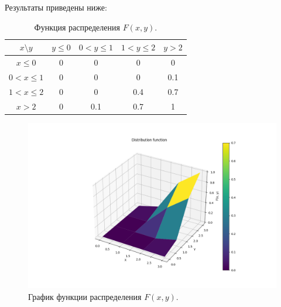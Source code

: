 \documentclass[a4paper, 12pt]{article}
\begin{document}
    Результаты приведены ниже:
    \begin{table}[h]
        \centering
        \begin{tabular}{|c|c|c|c|c|}
        \hline
        $x \text{\textbackslash} y$ & $y\leq0$ & $0<y\leq1$ & $1<y\leq2$ & $y>2$ \\
        \hline
        $x\leq0$ & 0 & 0 & 0 & 0\\
        \hline
        $0<x\leq1$ & 0 & 0 & 0 & 0.1\\
        \hline
        $1<x\leq2$ & 0 & 0 & 0.4 & 0.7\\
        \hline
        $x>2$ & 0 & 0.1 & 0.7 & 1\\
        \hline
        \end{tabular}
        \caption{Функция распределения $F(x,y)$.}
        \label{tab:F_x}
    \end{table}
    \begin{figure}[H]
        \centering
        \includegraphics[scale=0.5]{disf.png}
        \captionsetup{skip=0pt}
        \caption{График функции распределения $F(x,y)$.}
        \label{fig:F_xg}
    \end{figure}
\end{document}
